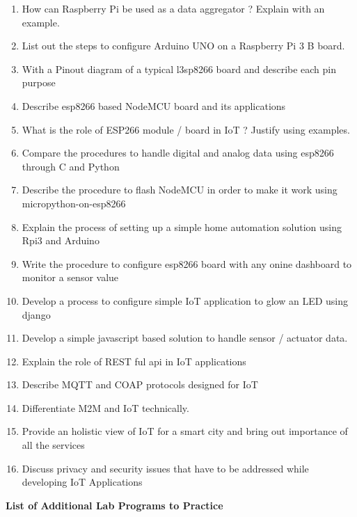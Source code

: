 \documentclass[12pt,a4paper]{article}
\begin{document}
\begin{enumerate}
\item How can Raspberry Pi be used as a data aggregator ? Explain with an example.
\item List out the steps to configure Arduino UNO on a Raspberry Pi 3 B board.
\item With a Pinout diagram of a typical l3sp8266 board and describe each pin purpose
\item Describe esp8266 based NodeMCU board and its applications
\item What is the role of ESP266 module / board in IoT ? Justify using examples.
\item Compare the procedures to handle digital and analog data using esp8266 through C and Python
\item Describe the procedure to flash NodeMCU in order to make it work using micropython-on-esp8266 
\item Explain the process of setting up a simple home automation solution using Rpi3 and Arduino
\item Write the procedure to configure esp8266 board with any onine dashboard to monitor a sensor value
\item Develop a process to configure simple IoT application to glow an LED using django
\item Develop a simple javascript based solution to handle sensor / actuator data.
\item Explain the role of REST ful api in IoT applications 
\item Describe MQTT and COAP protocols designed for IoT
\item Differentiate M2M and IoT technically.
\item Provide an holistic view of IoT for a smart city and bring out importance of all the services
\item Discuss privacy and security issues that have to be addressed while developing IoT Applications
\end{enumerate}
\vspace{5mm}
\begin{center}
\large {\textbf{List of Additional Lab Programs to Practice}} \end{center}
\end{document}
